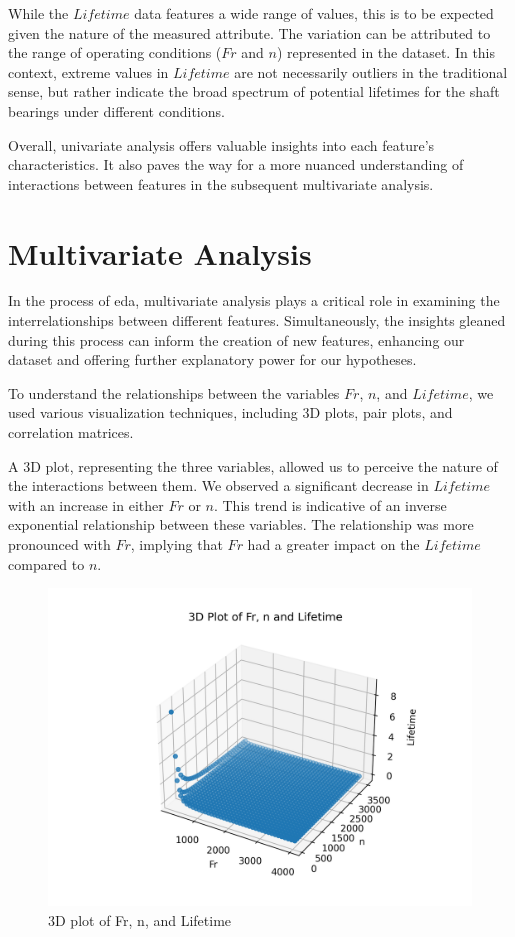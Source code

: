While the $Lifetime$ data features a wide range of values, this is to be expected given the nature of the measured attribute. The variation can be attributed to the range of operating conditions ($Fr$ and $n$) represented in the dataset. In this context, extreme values in $Lifetime$ are not necessarily outliers in the traditional sense, but rather indicate the broad spectrum of potential lifetimes for the shaft bearings under different conditions.

Overall, univariate analysis offers valuable insights into each feature's characteristics. It also paves the way for a more nuanced understanding of interactions between features in the subsequent multivariate analysis.


\section{Multivariate Analysis}

In the process of \ac{eda}, multivariate analysis plays a critical role in examining the interrelationships between different features. Simultaneously, the insights gleaned during this process can inform the creation of new features, enhancing our dataset and offering further explanatory power for our hypotheses.

To understand the relationships between the variables $Fr$, $n$, and $Lifetime$, we used various visualization techniques, including 3D plots, pair plots, and correlation matrices.

A 3D plot, representing the three variables, allowed us to perceive the nature of the interactions between them. We observed a significant decrease in $Lifetime$ with an increase in either $Fr$ or $n$. This trend is indicative of an inverse exponential relationship between these variables. The relationship was more pronounced with $Fr$, implying that $Fr$ had a greater impact on the $Lifetime$ compared to $n$.

\begin{figure}[ht]
    \centering
    \includegraphics[width=\textwidth]{assets/bearings-eda/3dplot.png}
    \caption{3D plot of Fr, n, and Lifetime}
    \label{fig:bearings-3dplot}
\end{figure}

